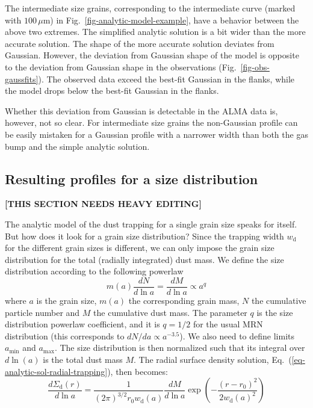 \documentclass{aa}
\begin{document}
The intermediate size grains, corresponding to the intermediate curve (marked
with $100\,\mu\mathrm{m}$) in Fig.~\ref{fig-analytic-model-example}, have a
behavior between the above two extremes. The simplified analytic solution is a
bit wider than the more accurate solution. The shape of the more accurate
solution deviates from Gaussian. However, the deviation from Gaussian shape of
the model is opposite to the deviation from Gaussian shape in the observations
(Fig.~\ref{fig-obs-gaussfits}). The observed data exceed the best-fit Gaussian
in the flanks, while the model drops below the best-fit Gaussian in the flanks.

Whether this deviation from Gaussian is detectable in the ALMA data is,
however, not so clear. For intermediate size grains the non-Gaussian profile
can be easily mistaken for a Gaussian profile with a narrower width than
both the gas bump and the simple analytic solution. 







\subsection{Resulting profiles for a size distribution}
\label{sec-anmodel-profiles}
%

{\bf [THIS SECTION NEEDS HEAVY EDITING]}

The analytic model of the dust trapping for a single grain size speaks for
itself. But how does it look for a grain size distribution? Since the trapping
width $w_{\mathrm{d}}$ for the different grain sizes is different, we can only
impose the grain size distribution for the total (radially integrated) dust
mass. We define the size distribution according to the following powerlaw
\begin{equation}
m(a)\frac{dN}{d\ln a} = \frac{dM}{d\ln a} \propto a^{q}
\end{equation}
where $a$ is the grain size, $m(a)$ the corresponding grain mass, $N$ the
cumulative particle number and $M$ the cumulative dust mass. The parameter $q$
is the size distribution powerlaw coefficient, and it is $q=1/2$ for the usual
MRN distribution (this corresponds to $dN/da\propto a^{-3.5}$). We also need to
define limits $a_{\mathrm{min}}$ and $a_{\mathrm{max}}$. The size distribution
is then normalized such that its integral over $d\ln(a)$ is the total dust mass
$M$. The radial surface density solution,
Eq.~(\ref{eq-analytic-sol-radial-trapping}), then becomes:
\begin{equation}\label{eq-analytic-sol-radial-trapping-sizedistr}
\frac{d\Sigma_{\mathrm{d}}(r)}{d\ln a} = \frac{1}{(2\pi)^{3/2}r_0
    w_{\mathrm{d}}(a)}\frac{dM}{d\ln a}
\exp\left(-\frac{(r-r_0)^2}{2w_{\mathrm{d}}(a)^2}\right)
\end{equation}
\end{document}
